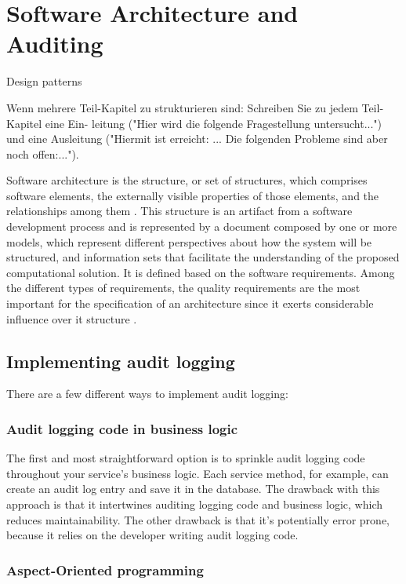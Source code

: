 %
\chapter{Software Architecture and Auditing}
Design patterns

Wenn mehrere Teil-Kapitel zu strukturieren sind: Schreiben Sie zu jedem Teil-Kapitel eine Ein- leitung ("Hier wird die folgende Fragestellung untersucht...") und eine Ausleitung ("Hiermit ist erreicht: ... Die folgenden Probleme sind aber noch offen:...").

Software architecture is the structure, or set of structures, which comprises
software elements, the externally visible properties of those elements, and the
relationships among them \citep{SAIP}. This structure is an artifact from a software
development process and is represented by a document composed by one or more
models, which represent different perspectives about how the system will be
structured, and information sets that facilitate the understanding of the proposed
computational solution. It is defined based on the software requirements. Among the
different types of requirements, the quality requirements are the most important for
the specification of an architecture since it exerts considerable influence over it
structure \citep{SAIP}.

\section{Implementing audit logging}

There are a few different ways to implement audit logging:~\cite{richardson2018microservices}

\subsection{Audit logging code in business logic}

The first and most straightforward option is to sprinkle audit logging code throughout your service’s business logic. Each service method, for example, can create an
audit log entry and save it in the database. The drawback with this approach is that it
intertwines auditing logging code and business logic, which reduces maintainability.
The other drawback is that it’s potentially error prone, because it relies on the developer writing audit logging code.

\subsection{Aspect-Oriented programming}

